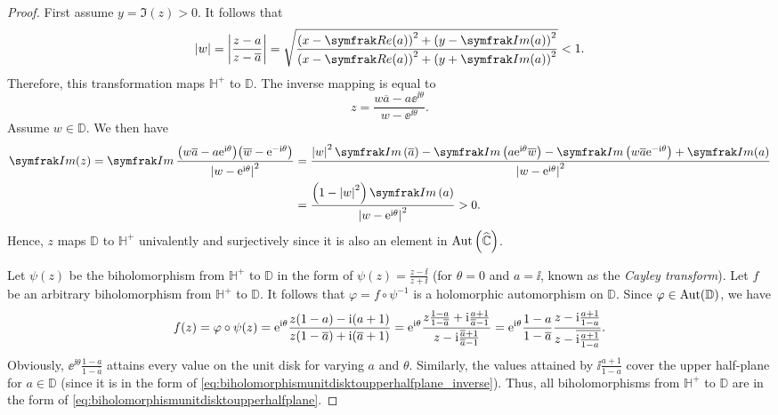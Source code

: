 \begin{proof}
    First assume \(y=\Im(z)>0\). It follows that \[\abs{w}=\abs{\frac{z-a}{z-\overline{a}}}=\sqrt{\frac{\qty(x-\Re(a))^2+\qty(y-\Im(a))^2}{\qty(x-\Re(a))^2+\qty(y+\Im(a))^2}}<1.\] Therefore, this transformation maps \(\mathbb{H}^+\) to \(\mathbb{D}\). The inverse mapping is equal to
    \begin{equation}
        z=\frac{w\overline{a}-a\ee^{\ii\theta}}{w-\ee^{\ii\theta}}.\label{eq:biholomorphismunitdisktoupperhalfplane_inverse}
    \end{equation}
    Assume \(w\in\mathbb{D}\). We then have
    \begin{align*}
        \Im(z)=\Im\frac{\qty(w\overline{a}-a\ee^{\ii\theta})\qty(\overline{w}-\ee^{-\ii\theta})}{\abs{w-\ee^{\ii\theta}}^2} & =\frac{\abs{w}^2\Im\qty(\overline{a})-\Im\qty(a\ee^{\ii\theta}\overline{w})-\Im\qty(w\overline{a}\ee^{-\ii\theta})+\Im(a)}{\abs{w-\ee^{\ii\theta}}^2} \\
                                                                                                                            & =\frac{\qty(1-\abs{w}^2)\Im\qty(a)}{\abs{w-\ee^{\ii\theta}}^2}>0.
    \end{align*}
    Hence, \(z\) maps \(\mathbb{D}\) to \(\mathbb{H}^+\) univalently and surjectively since it is also an element in \(\operatorname{Aut}\qty(\widehat{\mathbb{C}})\).

    Let \(\psi(z)\) be the biholomorphism from \(\mathbb{H}^+\) to \(\mathbb{D}\) in the form of \(\psi(z)=\frac{z-\ii}{z+\ii}\) (for \(\theta=0\) and \(a=\ii\), known as the \textit{Cayley transform}). Let \(f\) be an arbitrary biholomorphism from \(\mathbb{H}^+\) to \(\mathbb{D}\). It follows that \(\varphi=f\circ\psi^{-1}\) is a holomorphic automorphism on \(\mathbb{D}\). Since \(\varphi\in\operatorname{Aut}(\mathbb{D})\), we have \[f(z)=\varphi\circ\psi(z)=\mathrm{e}^{\mathrm{i}\theta}\frac{z\qty(1-a)-\mathrm{i}\qty(a+1)}{z\qty(1-\overline{a})+\mathrm{i}\qty(\overline{a}+1)}=\mathrm{e}^{\mathrm{i}\theta}\frac{z\frac{1-a}{1-\overline{a}}+\mathrm{i}\frac{a+1}{\overline{a}-1}}{z-\mathrm{i}\frac{\overline{a}+1}{\overline{a}-1}}=\mathrm{e}^{\mathrm{i}\theta}\frac{1-a}{1-\overline{a}}\frac{z-\mathrm{i}\frac{a+1}{1-a}}{z-\overline{\mathrm{i}\frac{a+1}{1-a}}}.\]
    Obviously, \(\ee^{\ii\theta}\frac{1-a}{1-\overline{a}}\) attains every value on the unit disk for varying \(a\) and \(\theta\). Similarly, the values attained by \(\ii\frac{a+1}{1-a}\) cover the upper half-plane for \(a\in\mathbb{D}\) (since it is in the form of \cref{eq:biholomorphismunitdisktoupperhalfplane_inverse}). Thus, all biholomorphisms from \(\mathbb{H}^+\) to \(\mathbb{D}\) are in the form of \cref{eq:biholomorphismunitdisktoupperhalfplane}.
\end{proof}
